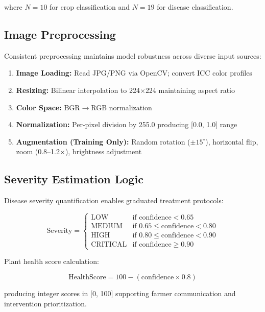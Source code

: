 \documentclass[conference]{IEEEtran}
\begin{document}
where $N=10$ for crop classification and $N=19$ for disease classification.

\subsection{Image Preprocessing}

Consistent preprocessing maintains model robustness across diverse input sources:

\begin{enumerate}
\item \textbf{Image Loading:} Read JPG/PNG via OpenCV; convert ICC color profiles
\item \textbf{Resizing:} Bilinear interpolation to 224$\times$224 maintaining aspect ratio
\item \textbf{Color Space:} BGR$\rightarrow$RGB normalization
\item \textbf{Normalization:} Per-pixel division by 255.0 producing [0.0, 1.0] range
\item \textbf{Augmentation (Training Only):} Random rotation ($\pm 15^{\circ}$), horizontal flip, zoom (0.8--1.2$\times$), brightness adjustment
\end{enumerate}

\subsection{Severity Estimation Logic}

Disease severity quantification enables graduated treatment protocols:

\begin{equation}
\text{Severity} = 
\begin{cases}
\text{LOW} & \text{if } \text{confidence} < 0.65 \\
\text{MEDIUM} & \text{if } 0.65 \leq \text{confidence} < 0.80 \\
\text{HIGH} & \text{if } 0.80 \leq \text{confidence} < 0.90 \\
\text{CRITICAL} & \text{if } \text{confidence} \geq 0.90
\end{cases}
\end{equation}

Plant health score calculation:

\begin{equation}
\text{HealthScore} = 100 - (\text{confidence} \times 0.8)
\end{equation}

producing integer scores in [0, 100] supporting farmer communication and intervention prioritization.
\end{document}
